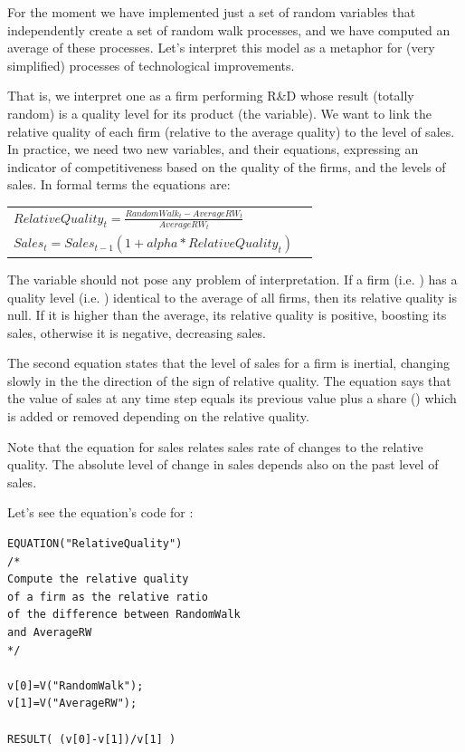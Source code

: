 \documentclass [11pt,a4paper] {book}
\begin{document}
For the moment we have implemented just a set of random variables that independently create a set of random walk
processes, and we have computed an average of these processes. Let's interpret this model
as a metaphor for (very simplified) processes of technological improvements.

That is, we interpret one  as a firm performing R\&D whose result (totally random)
is a quality level for its product (the  variable). We want to link the
relative quality of each firm (relative to the average quality) to the level of sales.
In practice, we need two new variables, and their equations, expressing an indicator of competitiveness based on the quality of the firms, and the levels of sales. In formal terms the
equations are:

\begin{tabular}{ll}\label{eq:relativequality}

$RelativeQuality_t=\displaystyle \frac{RandomWalk_t-AverageRW_t}{AverageRW_t}$
\\
$ Sales_t=Sales_{t-1}(1+alpha*RelativeQuality_t)$

\end{tabular}

The variable  should not pose any problem of interpretation. If a
firm (i.e. ) has a quality level (i.e. ) identical to the
average of all firms, then its relative quality is null. If it is higher than the average, its relative
quality is positive, boosting its sales, otherwise it is negative, decreasing sales.

The second equation states that the level of sales for a
firm is inertial, changing slowly in the the direction of the sign of relative quality. The equation
says that the value of sales at any time step equals its previous value plus a share
() which is added or removed depending on the relative quality. 

Note that the equation for sales relates sales rate of changes to the relative quality. The absolute level of change in sales depends also on the past level of sales.

Let's see the equation's code for :
\small
\begin{verbatim}
EQUATION("RelativeQuality")
/*
Compute the relative quality
of a firm as the relative ratio
of the difference between RandomWalk
and AverageRW
*/

v[0]=V("RandomWalk");
v[1]=V("AverageRW");

RESULT( (v[0]-v[1])/v[1] )

\end{verbatim}
\normalsize
\end{document}
